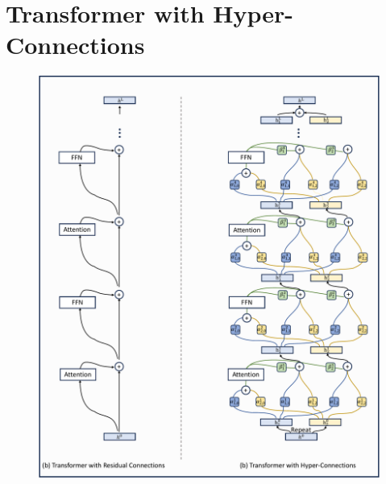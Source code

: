 \newpage
\appendix
\section{Transformer with Hyper-Connections}
\label{app:trans_with_hc}
\begin{figure}[h]
    \begin{center}
    \includegraphics[width=1\textwidth]{fig/trans_with_hc.pdf}
    \end{center}
  \caption{}
    \label{fig:trans_with_hc}
\end{figure}

\newpage

